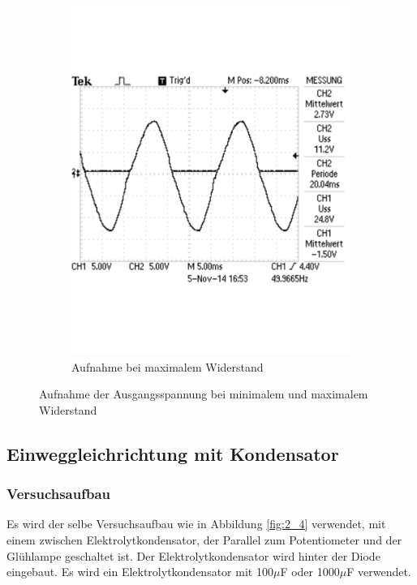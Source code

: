 \documentclass[12pt,a4paper]{article}
\begin{document}
\begin{figure}[H]
\begin{subfigure}[b]{0.48\textwidth}
                \includegraphics[width=\textwidth , scale = 0.4]{2_3_2.pdf}
                \caption[Aufnahme bei maximalem Widerstand]{Aufnahme bei maximalem Widerstand}
  				\label{fig:2_3_2}
        \end{subfigure}
        \caption{Aufnahme der Ausgangsspannung bei minimalem und maximalem Widerstand}
        \label{fig:2_3}
\end{figure}


\subsection{Einweggleichrichtung mit Kondensator}
\subsubsection{Versuchsaufbau}
Es wird der selbe Versuchsaufbau wie in Abbildung \ref{fig:2_4} verwendet, mit einem zwischen Elektrolytkondensator, der Parallel zum Potentiometer und der Glühlampe geschaltet ist. Der Elektrolytkondensator wird hinter der Diode eingebaut. Es wird ein Elektrolytkondensator mit 100$\mu$F oder 1000$\mu$F verwendet.
\end{document}
